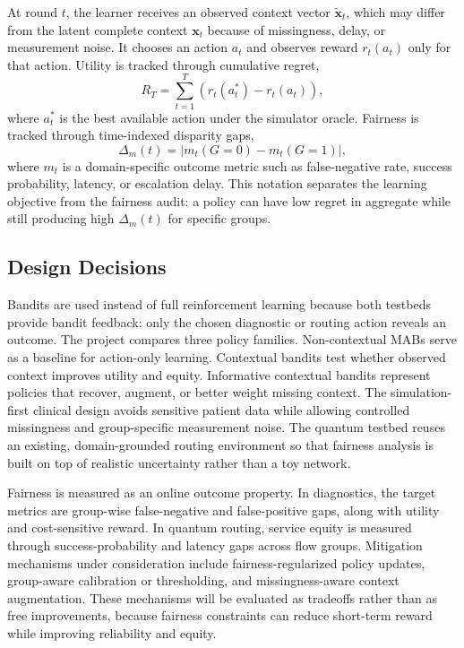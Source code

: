 \documentclass[conference]{IEEEtran}
\begin{document}
At round $t$, the learner receives an observed context vector
$\tilde{\mathbf{x}}_t$, which may differ from the latent complete context
$\mathbf{x}_t$ because of missingness, delay, or measurement noise. It chooses
an action $a_t$ and observes reward $r_t(a_t)$ only for that action. Utility is
tracked through cumulative regret,
\begin{equation}
R_T = \sum_{t=1}^{T} \left(r_t(a_t^*) - r_t(a_t)\right),
\label{eq:regret}
\end{equation}
where $a_t^*$ is the best available action under the simulator oracle.
Fairness is tracked through time-indexed disparity gaps,
\begin{equation}
\Delta_m(t) =
\left|m_t(G=0) - m_t(G=1)\right|,
\label{eq:gap}
\end{equation}
where $m_t$ is a domain-specific outcome metric such as false-negative rate,
success probability, latency, or escalation delay. This notation separates the
learning objective from the fairness audit: a policy can have low regret in
aggregate while still producing high $\Delta_m(t)$ for specific groups.

\subsection{Design Decisions}
Bandits are used instead of full reinforcement learning because both testbeds
provide bandit feedback: only the chosen diagnostic or routing action reveals
an outcome. The project compares three policy families. Non-contextual MABs
serve as a baseline for action-only learning. Contextual bandits test whether
observed context improves utility and equity. Informative contextual bandits
represent policies that recover, augment, or better weight missing context.
The simulation-first clinical design avoids sensitive patient data while
allowing controlled missingness and group-specific measurement noise. The
quantum testbed reuses an existing, domain-grounded routing environment so
that fairness analysis is built on top of realistic uncertainty rather than
a toy network.

Fairness is measured as an online outcome property. In diagnostics, the target
metrics are group-wise false-negative and false-positive gaps, along with
utility and cost-sensitive reward. In quantum routing, service equity is
measured through success-probability and latency gaps across flow groups.
Mitigation mechanisms under consideration include fairness-regularized policy
updates, group-aware calibration or thresholding, and missingness-aware
context augmentation. These mechanisms will be evaluated as tradeoffs rather
than as free improvements, because fairness constraints can reduce short-term
reward while improving reliability and equity.
\end{document}
